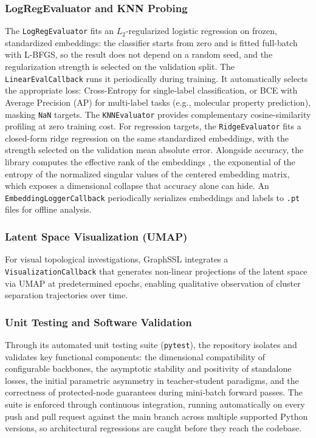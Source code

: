\documentclass[conference]{IEEEtran}
\begin{document}
\subsubsection{LogRegEvaluator and KNN Probing}
The \texttt{LogRegEvaluator} fits an $L_2$-regularized logistic regression on frozen, standardized embeddings: the classifier starts from zero and is fitted full-batch with L-BFGS, so the result does not depend on a random seed, and the regularization strength is selected on the validation split. The \texttt{LinearEvalCallback} runs it periodically during training. It automatically selects the appropriate loss: Cross-Entropy for single-label classification, or BCE with Average Precision (AP) for multi-label tasks (e.g., molecular property prediction), masking \texttt{NaN} targets. The \texttt{KNNEvaluator} provides complementary cosine-similarity profiling at zero training cost. For regression targets, the \texttt{RidgeEvaluator} fits a closed-form ridge regression on the same standardized embeddings, with the strength selected on the validation mean absolute error. Alongside accuracy, the library computes the effective rank of the embeddings \cite{roy2007effective}, the exponential of the entropy of the normalized singular values of the centered embedding matrix, which exposes a dimensional collapse that accuracy alone can hide. An \texttt{EmbeddingLoggerCallback} periodically serializes embeddings and labels to \texttt{.pt} files for offline analysis.

\subsubsection{Latent Space Visualization (UMAP)}
For visual topological investigations, GraphSSL integrates a \texttt{VisualizationCallback} that generates non-linear projections of the latent space via UMAP at predetermined epochs, enabling qualitative observation of cluster separation trajectories over time.

\subsubsection{Unit Testing and Software Validation}
Through its automated unit testing suite (\texttt{pytest}), the repository isolates and validates key functional components: the dimensional compatibility of configurable backbones, the asymptotic stability and positivity of standalone losses, the initial parametric asymmetry in teacher-student paradigms, and the correctness of protected-node guarantees during mini-batch forward passes. The suite is enforced through continuous integration, running automatically on every push and pull request against the main branch across multiple supported Python versions, so architectural regressions are caught before they reach the codebase.
\end{document}
